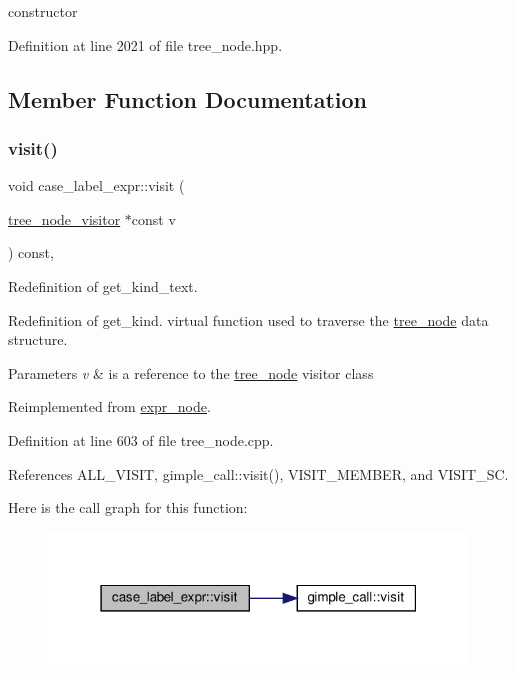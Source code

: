 constructor 



Definition at line 2021 of file tree\+\_\+node.\+hpp.



\subsection{Member Function Documentation}
\mbox{\label{structcase__label__expr_ae05b2b2dac08585cdcf52aa97190ed4c}} 
\subsubsection{\texorpdfstring{visit()}{visit()}}
{\footnotesize\ttfamily void case\+\_\+label\+\_\+expr\+::visit (\begin{DoxyParamCaption}\item[{\hyperlink{classtree__node__visitor}{tree\+\_\+node\+\_\+visitor} $\ast$const}]{v }\end{DoxyParamCaption}) const\hspace{0.3cm}{\ttfamily [override]}, {\ttfamily [virtual]}}



Redefinition of get\+\_\+kind\+\_\+text. 

Redefinition of get\+\_\+kind. virtual function used to traverse the \hyperlink{classtree__node}{tree\+\_\+node} data structure. 
\begin{DoxyParams}{Parameters}
{\em v} & is a reference to the \hyperlink{classtree__node}{tree\+\_\+node} visitor class \\
\hline
\end{DoxyParams}


Reimplemented from \hyperlink{structexpr__node_aac767878f13ca07371dde2c3938ef38a}{expr\+\_\+node}.



Definition at line 603 of file tree\+\_\+node.\+cpp.



References A\+L\+L\+\_\+\+V\+I\+S\+IT, gimple\+\_\+call\+::visit(), V\+I\+S\+I\+T\+\_\+\+M\+E\+M\+B\+ER, and V\+I\+S\+I\+T\+\_\+\+SC.

Here is the call graph for this function\+:
\nopagebreak
\begin{figure}[H]
\begin{center}
\leavevmode
\includegraphics[width=316pt]{d8/d16/structcase__label__expr_ae05b2b2dac08585cdcf52aa97190ed4c_cgraph}
\end{center}
\end{figure}


